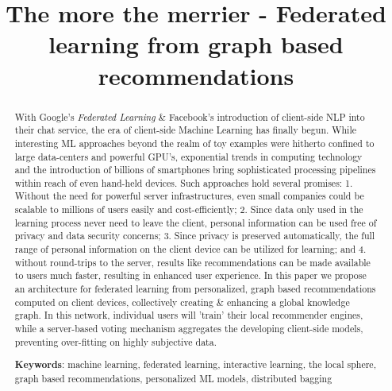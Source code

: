 \documentclass{llncs}
\begin{document}
\title{The more the merrier - Federated learning from graph based recommendations}


	
\maketitle

\begin{abstract}
	
With Google's \textit{Federated Learning} \& Facebook's introduction of client-side NLP into their chat service, the era of client-side Machine Learning has finally begun. While interesting ML approaches beyond the realm of toy examples were hitherto confined to large data-centers and powerful GPU's, exponential trends in computing technology and the introduction of billions of smartphones bring sophisticated processing pipelines within reach of even hand-held devices. Such approaches hold several promises: 1. Without the need for powerful server infrastructures, even small companies could be scalable to millions of users easily and cost-efficiently; 2. Since data only used in the learning process never need to leave the client, personal information can be used free of privacy and data security concerns; 3. Since privacy is preserved automatically, the full range of personal information on the client device can be utilized for learning; and 4. without round-trips to the server, results like recommendations can be made available to users much faster, resulting in enhanced user experience. In this paper we propose an architecture for federated learning from personalized, graph based recommendations computed on client devices, collectively creating \& enhancing a global knowledge graph. In this network, individual users will 'train' their local recommender engines, while a server-based voting mechanism aggregates the developing client-side models, preventing over-fitting on highly subjective data.

\medskip

\textbf{Keywords}: machine learning, federated learning, interactive learning, the local sphere, graph based recommendations, personalized ML models, distributed bagging


\end{abstract}
\end{document}
